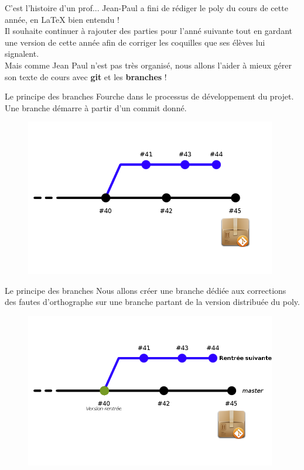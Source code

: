 \documentclass{beamer}
\begin{document}
\begin{frame}{C'est l'histoire d'un prof...}
	Jean-Paul a fini de rédiger le poly du cours de cette année, en \LaTeX{} bien entendu !\\
	
	
	Il souhaite continuer à rajouter des parties pour l'anné suivante tout en gardant une version de cette année afin de corriger les coquilles que ses élèves lui signalent.\\
	Mais comme Jean Paul n'est pas très organisé, nous allons l'aider à mieux gérer son texte de cours avec \textbf{git} et les \textbf{branches} !	
\end{frame}

\begin{frame}{Le principe des branches}
	Fourche dans le processus de développement du projet. Une branche démarre à partir d'un commit donné.
	
	\begin{figure}
		\centering
		\includegraphics[width=11cm]{img/repo4}
	\end{figure}
\end{frame}

\begin{frame}{Le principe des branches}
	Nous allons créer une branche dédiée aux corrections des fautes d'orthographe sur une branche partant de la version distribuée du poly.
	
	\begin{figure}
		\centering
		\includegraphics[width=11cm]{img/repo4-2}
	\end{figure}
\end{frame}
\end{document}
